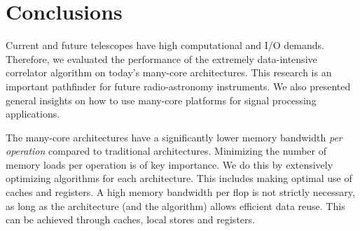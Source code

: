 \documentclass{article}
\newcommand{\longversion}[1]{}
\begin{document}
\longversion{
\section{Aplying the techniques: a case study with the Intel Larrabee}

Intel recently disclosed some details about the upcoming Larrabee processor,
a fully programmable GPU based on the well-known x86 instruction set.
Although performance details are unknown, it is interesting to compare the
Larrabee to the aforementioned architectures, and to see how a correlator
should be implemented to obtain optimal performance.

The processing power comes from Larrabee's relatively long vector size:
a vector holds 16~elements, where the other architectures have vectors lengths
of at most~4.
The long vector size forces us to reconsider our parallelization strategy.
There are several options to perform 16~simultaneous FMAs.
One option is to operate on 16~samples with consecutive time stamps.
A minor drawback is that the data must be ``horizontally'' added to integrate,
but this can be done outside the main loop.
Another option is to operate on samples from 16~consecutive frequencies.

Another option is to correlate samples from different receivers as illustrated
by Figure~\ref{fig-correlation}.
This method minimizes memory loads, but requires additional shuffling of data.
Unfortunately, the most efficient method can only be determined empirically,
when the hardware is available.
} %

\section{Conclusions}
\label{conclusions}
Current and future telescopes have high computational and I/O demands.
Therefore, we evaluated the performance of the extremely
data-intensive correlator algorithm on today's many-core
architectures. This research is an important pathfinder for future
radio-astronomy instruments. We also presented general insights on how to use many-core
platforms for signal processing applications.

The many-core architectures have a significantly lower memory
bandwidth \emph{per operation} compared to traditional architectures.
Minimizing the number of memory loads per operation is of key
importance.  We do this by extensively optimizing algorithms for each
architecture.  This includes making optimal use of caches and
registers.  A high memory bandwidth per flop is not strictly
necessary, as long as the architecture (and the algorithm) allows efficient data reuse.
This can be achieved through caches, local stores and registers.
\end{document}
